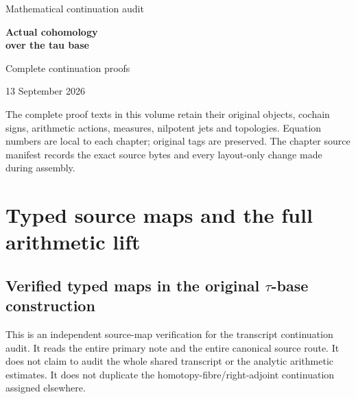 \documentclass[10pt,a4paper,oneside]{report}
\begin{document}
\begin{titlepage}
\vspace*{22mm}
{\sffamily\Large Mathematical continuation audit\par}
\vspace{12mm}
{\sffamily\bfseries\huge Actual cohomology\\[3mm]over the tau base\par}
\vspace{12mm}
{\Large Complete continuation proofs\par}
\vspace{8mm}
{\large 13 September 2026\par}
\vfill
The complete proof texts in this volume retain their original objects,
cochain signs, arithmetic actions, measures, nilpotent jets and topologies.
Equation numbers are local to each chapter; original tags are preserved.
The chapter source manifest records the exact source bytes and every
layout-only change made during assembly.
\end{titlepage}
\tableofcontents
\clearpage

\chapter{Typed source maps and the full arithmetic lift}
\begingroup

\section{\texorpdfstring{Verified typed maps in the original \(\tau\)-base construction}{Verified typed maps in the original tau-base construction}}\label{proof01:source-maps-verified-typed-maps-in-the-original-ux3c4-base-construction}

This is an independent source-map verification for the transcript continuation audit. It reads the entire primary note and the entire canonical source route. It does not claim to audit the whole shared transcript or the analytic arithmetic estimates. It does not duplicate the homotopy-fibre/right-adjoint continuation assigned elsewhere.
\end{document}
